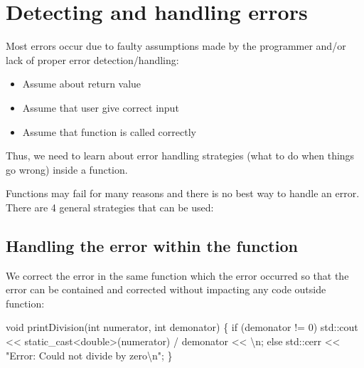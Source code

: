 \documentclass[
  letterpaper,
  DIV=11,
  numbers=noendperiod]{scrreprt}
\newenvironment{Shaded}{\begin{snugshade}}{\end{snugshade}}
\newcommand{\ControlFlowTok}[1]{\textcolor[rgb]{0.00,0.23,0.31}{#1}}
\newcommand{\DecValTok}[1]{\textcolor[rgb]{0.68,0.00,0.00}{#1}}
\newcommand{\ErrorTok}[1]{\textcolor[rgb]{0.68,0.00,0.00}{#1}}
\newcommand{\FunctionTok}[1]{\textcolor[rgb]{0.28,0.35,0.67}{#1}}
\newcommand{\NormalTok}[1]{\textcolor[rgb]{0.00,0.23,0.31}{#1}}
\newcommand{\SpecialCharTok}[1]{\textcolor[rgb]{0.37,0.37,0.37}{#1}}
\newcommand{\StringTok}[1]{\textcolor[rgb]{0.13,0.47,0.30}{#1}}
\providecommand{\tightlist}{%
  \setlength{\itemsep}{0pt}\setlength{\parskip}{0pt}}\usepackage{longtable,booktabs,array}
\begin{document}
\hypertarget{detecting-and-handling-errors}{%
\section{Detecting and handling
errors}\label{detecting-and-handling-errors}}

Most errors occur due to faulty assumptions made by the programmer
and/or lack of proper error detection/handling:

\begin{itemize}
\tightlist
\item
  Assume about return value
\item
  Assume that user give correct input
\item
  Assume that function is called correctly
\end{itemize}

Thus, we need to learn about error handling strategies (what to do when
things go wrong) inside a function.

Functions may fail for many reasons and there is no best way to handle
an error. There are 4 general strategies that can be used:

\hypertarget{handling-the-error-within-the-function}{%
\subsection{Handling the error within the
function}\label{handling-the-error-within-the-function}}

We correct the error in the same function which the error occurred so
that the error can be contained and corrected without impacting any code
outside function:

\begin{Shaded}
\begin{Highlighting}[]
\NormalTok{void }\FunctionTok{printDivision}\NormalTok{(int numerator, int demonator)}
\NormalTok{\{}
    \ControlFlowTok{if}\NormalTok{ (demonator }\SpecialCharTok{!=} \DecValTok{0}\NormalTok{)}
\NormalTok{        std}\SpecialCharTok{::}\NormalTok{cout }\SpecialCharTok{\textless{}}\ErrorTok{\textless{}}\NormalTok{ static\_cast}\SpecialCharTok{\textless{}}\NormalTok{double}\SpecialCharTok{\textgreater{}}\NormalTok{(numerator) }\SpecialCharTok{/}\NormalTok{ demonator }\SpecialCharTok{\textless{}}\ErrorTok{\textless{}} \StringTok{\textquotesingle{}}\SpecialCharTok{\textbackslash{}n}\StringTok{\textquotesingle{}}\NormalTok{;}
    \ControlFlowTok{else}
\NormalTok{        std}\SpecialCharTok{::}\NormalTok{cerr }\SpecialCharTok{\textless{}}\ErrorTok{\textless{}} \StringTok{"Error: Could not divide by zero}\SpecialCharTok{\textbackslash{}n}\StringTok{"}\NormalTok{;}
\NormalTok{\}}
\end{Highlighting}
\end{Shaded}
\end{document}
